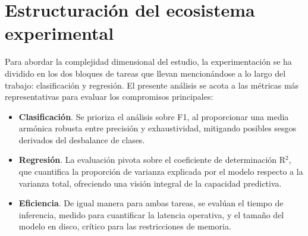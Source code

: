 \documentclass[a4paper,12pt,twoside,final]{book}
\begin{document}
\section{Estructuración del ecosistema experimental}
Para abordar la complejidad dimensional del estudio, la experimentación se ha dividido en los dos bloques de tareas
que llevan mencionándose a lo largo del trabajo: clasificación y regresión. El presente análisis se acota a las
métricas más representativas para evaluar los compromisos principales:
\begin{itemize}
  \item \textbf{Clasificación}. Se prioriza el análisis sobre F1, al proporcionar una media armónica robusta entre
  precisión y exhaustividad, mitigando posibles sesgos derivados del desbalance de clases.
  \item \textbf{Regresión}. La evaluación pivota sobre el coeficiente de determinación R$^2$, que cuantifica la
  proporción de varianza explicada por el modelo respecto a la varianza total, ofreciendo una visión integral de la
  capacidad predictiva.
  \item \textbf{Eficiencia}. De igual manera para ambas tareas, se evalúan el tiempo de inferencia, medido para
  cuantificar la latencia operativa, y el tamaño del modelo en disco, crítico para las restricciones de memoria.
\end{itemize}
\end{document}
